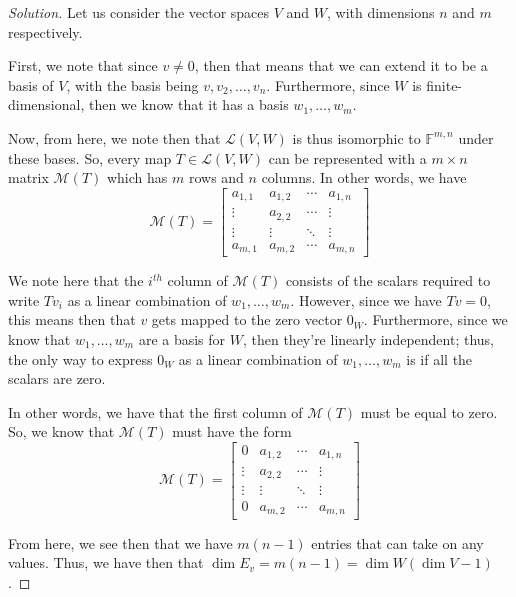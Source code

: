 \documentclass{article}
\newenvironment{solution}{\begin{proof}[Solution]}{\end{proof}}
\begin{document}
\begin{solution}
\begin{comment}
		
		Thus, we observe that the dimension of $E_{v}$ will be the same as $(\dim V - 1)\dim W$.
\end{comment}
	Let us consider the vector spaces $V$ and $W$, with dimensions $n$ and $m$ respectively. 
	
	First, we note that since $v \neq 0$, then that means that we can extend it to be a basis of $V$, with the basis being $v, v_{2}, \ldots, v_{n}$. Furthermore, since $W$ is finite-dimensional, then we know that it has a basis $w_{1}, \ldots, w_{m}$.
	
	Now, from here, we note then that $\mathcal L(V,W)$ is thus isomorphic to $\mathbb{F}^{m, n}$ under these bases. So, every map $T \in \mathcal L(V,W)$ can be represented with a $m \times n$ matrix $\mathcal M(T)$ which has $m$ rows and $n$ columns. In other words, we have
	\begin{equation*}
		\mathcal M(T) =
		\begin{bmatrix}
			a_{1,1} & a_{1,2} & \cdots & a_{1,n} \\
			\vdots & a_{2,2} & \cdots & \vdots \\
			\vdots & \vdots & \ddots & \vdots \\
			a_{m,1} & a_{m,2} & \cdots & a_{m,n}
		\end{bmatrix}
	\end{equation*}

	We note here that the $i^{th}$ column of $\mathcal M(T)$ consists of the scalars required to write $Tv_{i}$ as a linear combination of $w_{1}, \ldots, w_{m}$. However, since we have $Tv = 0$, this means then that $v$ gets mapped to the zero vector $0_{W}$. Furthermore, since we know that $w_{1}, \ldots, w_{m}$ are a basis for $W$, then they're linearly independent; thus, the only way to express $0_{W}$ as a linear combination of $w_{1}, \ldots, w_{m}$ is if all the scalars are zero.
	
	In other words, we have that the first column of $\mathcal M(T)$ must be equal to zero. So, we know that $\mathcal M(T)$ must have the form
		\begin{equation*}
		\mathcal M(T) =
		\begin{bmatrix}
			0 & a_{1,2} & \cdots & a_{1,n} \\
			\vdots & a_{2,2} & \cdots & \vdots \\
			\vdots & \vdots & \ddots & \vdots \\
			0 & a_{m,2} & \cdots & a_{m,n}
		\end{bmatrix}
	\end{equation*}

	From here, we see then that we have $m(n-1)$ entries that can take on any values. Thus, we have then that $\dim E_{v} = m(n-1) = \dim W (\dim V - 1)$.
	\end{solution}
\end{document}
